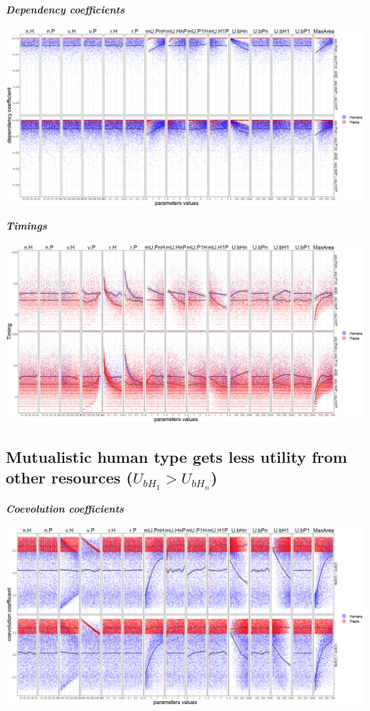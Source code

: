 \documentclass[]{book}
\begin{document}
\textbf{\emph{Dependency coefficients}}

\includegraphics[width=1\linewidth]{plots/5_multiplePar-depend-bothImprove-ggplot}

\textbf{\emph{Timings}}

\includegraphics[width=1\linewidth]{plots/5_multiplePar-timing-bothImprove-ggplot}

\newpage

\hypertarget{mutualistic-human-type-gets-less-utility-from-other-resources-u_bh_1u_bh_n}{%
\subsection{\texorpdfstring{Mutualistic human type gets less utility from other resources (\(U_{bH_{1}}>U_{bH_{n}}\))}{Mutualistic human type gets less utility from other resources (U\_\{bH\_\{1\}\}\textgreater{}U\_\{bH\_\{n\}\})}}\label{mutualistic-human-type-gets-less-utility-from-other-resources-u_bh_1u_bh_n}}


\textbf{\emph{Coevolution coefficients}}

\includegraphics[width=1\linewidth]{plots/5_multiplePar-coevo-humanLessBase-ggplot}
\end{document}
